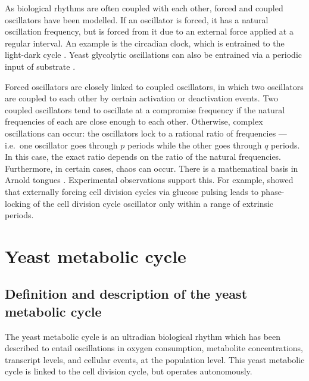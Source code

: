 As biological rhythms are often coupled with each other, forced and coupled oscillators have been modelled.
If an oscillator is forced, it has a natural oscillation frequency, but is forced from it due to an external force applied at a regular interval.
An example is the circadian clock, which is entrained to the light-dark cycle \parencite{goldbeterMultisynchronizationOtherPatterns}.
Yeast glycolytic oscillations can also be entrained via a periodic input of substrate \parencite{boiteuxControlOscillatingGlycolysis1975}.

Forced oscillators are closely linked to coupled oscillators, in which two oscillators are coupled to each other by certain activation or deactivation events.
Two coupled oscillators tend to oscillate at a compromise frequency if the natural frequencies of each are close enough to each other.
Otherwise, complex oscillations can occur: the oscillators lock to a rational ratio of frequencies --- i.e.\ one oscillator goes through $p$ periods while the other goes through $q$ periods.
In this case, the exact ratio depends on the ratio of the natural frequencies.
Furthermore, in certain cases, chaos can occur.
There is a mathematical basis in Arnold tongues \parencite{heltbergTaleTwoRhythms2021}.
Experimental observations support this.
For example, \textcite{charvinForcedPeriodicExpression2009} showed that externally forcing cell division cycles via glucose pulsing leads to phase-locking of the cell division cycle oscillator only within a range of extrinsic periods.


\section{Yeast metabolic cycle}
\label{sec:intro-ymc}

\subsection{Definition and description of the yeast metabolic cycle}
\label{subsec:intro-ymc-definition}

The yeast metabolic cycle is an ultradian biological rhythm which has been described to entail oscillations in oxygen consumption, metabolite concentrations, transcript levels, and cellular events, at the population level.
This yeast metabolic cycle is linked to the cell division cycle, but operates autonomously.

